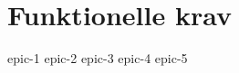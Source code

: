 \chapter{Funktionelle krav}

{epic-1}
{epic-2}\newpage
{epic-3}\newpage
{epic-4}\newpage
{epic-5}\newpage